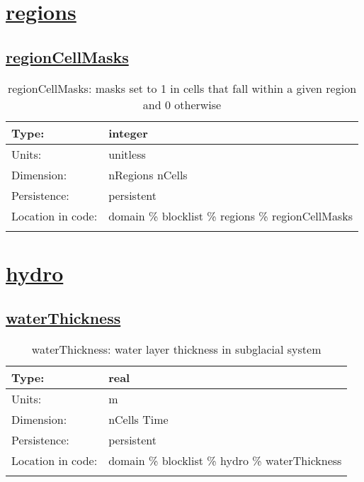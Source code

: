 \section[regions]{\hyperref[sec:var_tab_regions]{regions}}
\label{sec:var_sec_regions}
\subsection[regionCellMasks]{\hyperref[sec:var_tab_regions]{regionCellMasks}}
\label{subsec:var_sec_regions_regionCellMasks}
\begin{center}
\begin{longtable}{| p{2.0in} | p{4.0in} |}
        \hline 
        Type: & integer \\
        \hline 
        Units: & \si{unitless} \\
        \hline 
        Dimension: & nRegions nCells \\
        \hline 
        Persistence: & persistent \\
        \hline 
         Location in code: & domain \% blocklist \% regions \% regionCellMasks \\
         \hline 
    \caption{regionCellMasks: masks set to 1 in cells that fall within a given region and 0 otherwise}
\end{longtable}
\end{center}
\section[hydro]{\hyperref[sec:var_tab_hydro]{hydro}}
\label{sec:var_sec_hydro}
\subsection[waterThickness]{\hyperref[sec:var_tab_hydro]{waterThickness}}
\label{subsec:var_sec_hydro_waterThickness}
\begin{center}
\begin{longtable}{| p{2.0in} | p{4.0in} |}
        \hline 
        Type: & real \\
        \hline 
        Units: & \si{m} \\
        \hline 
        Dimension: & nCells Time \\
        \hline 
        Persistence: & persistent \\
        \hline 
         Location in code: & domain \% blocklist \% hydro \% waterThickness \\
         \hline 
    \caption{waterThickness: water layer thickness in subglacial system}
\end{longtable}
\end{center}
